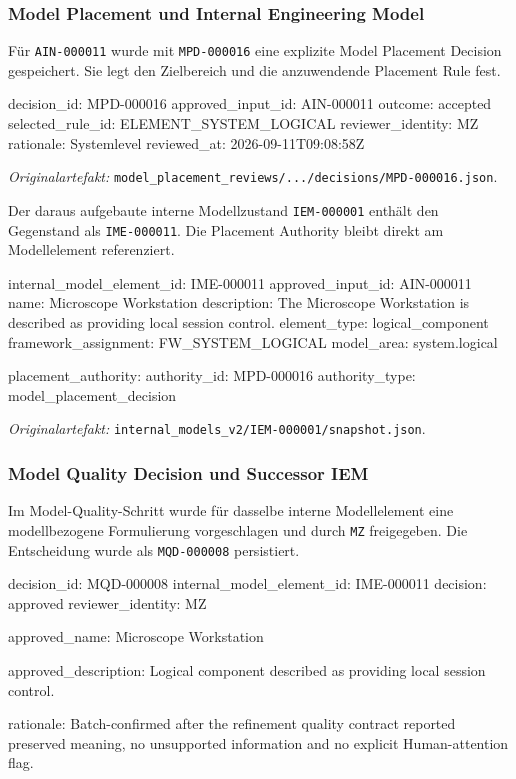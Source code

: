 \subsubsection{Model Placement und Internal Engineering Model}

Für \texttt{AIN-000011} wurde mit \texttt{MPD-000016} eine explizite Model
Placement Decision gespeichert. Sie legt den Zielbereich und die anzuwendende
Placement Rule fest.

\begin{evidencebox}
decision_id:       MPD-000016
approved_input_id: AIN-000011
outcome:           accepted
selected_rule_id:  ELEMENT_SYSTEM_LOGICAL
reviewer_identity: MZ
rationale:         Systemlevel
reviewed_at:       2026-09-11T09:08:58Z
\end{evidencebox}

\noindent\textit{Originalartefakt:}
\texttt{model\_placement\_reviews/.../decisions/MPD-000016.json}.

Der daraus aufgebaute interne Modellzustand \texttt{IEM-000001} enthält den
Gegenstand als \texttt{IME-000011}. Die Placement Authority bleibt direkt am
Modellelement referenziert.

\begin{evidencebox}
internal_model_element_id: IME-000011
approved_input_id:         AIN-000011
name:                      Microscope Workstation
description:               The Microscope Workstation is described as providing local session control.
element_type:              logical_component
framework_assignment:      FW_SYSTEM_LOGICAL
model_area:                system.logical

placement_authority:
  authority_id:            MPD-000016
  authority_type:          model_placement_decision
\end{evidencebox}

\noindent\textit{Originalartefakt:}
\texttt{internal\_models\_v2/IEM-000001/snapshot.json}.

\subsubsection{Model Quality Decision und Successor IEM}

Im Model-Quality-Schritt wurde für dasselbe interne Modellelement eine
modellbezogene Formulierung vorgeschlagen und durch \texttt{MZ} freigegeben.
Die Entscheidung wurde als \texttt{MQD-000008} persistiert.

\begin{evidencebox}
decision_id:              MQD-000008
internal_model_element_id: IME-000011
decision:                 approved
reviewer_identity:        MZ

approved_name:
  Microscope Workstation

approved_description:
  Logical component described as providing local session control.

rationale:
  Batch-confirmed after the refinement quality contract reported preserved
  meaning, no unsupported information and no explicit Human-attention flag.
\end{evidencebox}

